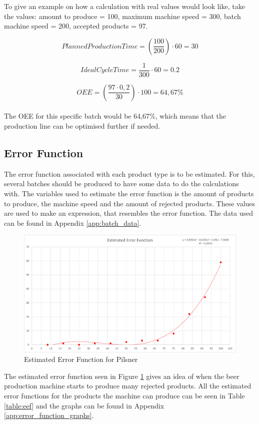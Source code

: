 To give an example on how a calculation with real values would look like, take
the values: amount to produce = 100, maximum machine speed = 300, batch machine
speed = 200, accepted products = 97.

\[PlannedProductionTime = \left(\frac{100}{200}\right)\cdot60 = 30\]

\[IdealCycleTime = \frac{1}{300}\cdot60=0.2\]

\[OEE = \left(\frac{97\cdot0,2}{30}\right)\cdot100 = 64,67\%\]\\

The OEE for this specific batch would be 64,67\%, which means that the
production line can be optimised further if needed.

\subsection{Error Function}
The error function associated with each product type is to be estimated. For
this, several batches should be produced to have some data to do the
calculations with. The variables used to estimate the error function is the
amount of products to produce, the machine speed and the amount of rejected
products. These values are used to make an expression, that resembles the error
function. The data used can be found in Appendix \ref{app:batch_data}.

\begin{figure}[ht]
	\centering
	\includegraphics[width=1\linewidth]{images/errorfunction/pilsner.png}
	\caption{Estimated Error Function for Pilsner}
	\label{figure:ef_pilsner}
\end{figure}

The estimated error function seen in Figure \ref{figure:ef_pilsner} gives an
idea of when the beer production machine starts to produce many rejected
products. All the estimated error functions for the products the machine can
produce can be seen in Table \ref{table:eef} and the graphs can be found in
Appendix \ref{app:error_function_graphs}.

